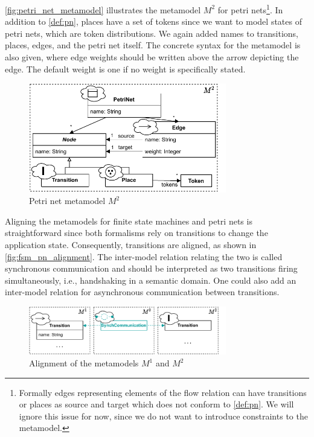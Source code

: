 \documentclass[conference]{IEEEtran}
\begin{document}
\autoref{fig:petri_net_metamodel} illustrates the metamodel $M^2$ for petri nets\footnote{Formally edges representing elements of the flow relation can have transitions or places as source and target which does not conform to \autoref{def:pn}.
We will ignore this issue for now, since we do not want to introduce constraints to the metamodel.}.
In addition to \autoref{def:pn}, places have a set of tokens since we want to model states of petri nets, which are token distributions.
We again added names to transitions, places, edges, and the petri net itself.
The concrete syntax for the metamodel is also given, where edge weights should be written above the arrow depicting the edge.
The default weight is one if no weight is specifically stated.

\begin{figure}[h]
    \centering
    \includegraphics[width=3.4in]{petri_net_metamodel}
    \caption{Petri net metamodel $M^2$}
    \label{fig:petri_net_metamodel}
\end{figure}

Aligning the metamodels for finite state machines and petri nets is straightforward since both formalisms rely on transitions to change the application state.
Consequently, transitions are aligned, as shown in \autoref{fig:fsm_pn_alignment}.
The inter-model relation relating the two is called synchronous communication and should be interpreted as two transitions firing simultaneously, i.e., handshaking in a semantic domain.
One could also add an inter-model relation for asynchronous communication between transitions.

\begin{figure}[h]
    \centering
    \includegraphics[width=3.4in]{fsm_pn_alignment}
    \caption{Alignment of the metamodels $M^1$ and $M^2$}
    \label{fig:fsm_pn_alignment}
\end{figure}
\end{document}
